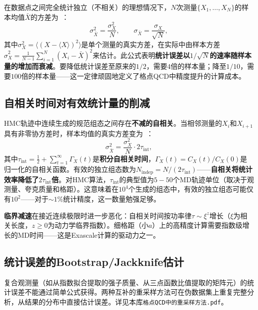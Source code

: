 \documentclass[12pt,a4paper]{ctexart}
\begin{document}
在数据点之间完全统计独立（不相关）的理想情况下，$N$次测量$\{X_1,\dots,X_N\}$的样本均值$\bar X$的方差为~\cite{GattringerLang2010}：
\begin{equation}
\boxed{\sigma^2_{\bar X} = \frac{\sigma_X^2}{N}, \qquad \sigma_{\bar X} = \frac{\sigma_X}{\sqrt{N}}},
\label{eq:sigma_over_rootN}
\end{equation}
其中$\sigma_X^2 = \langle (X - \langle X\rangle)^2 \rangle$是单个测量的真实方差，在实际中由样本方差$\hat\sigma_X^2 = \frac{1}{N-1}\sum_{i=1}^N (X_i - \bar X)^2$来估计。此公式表明\textbf{统计误差以$1/\sqrt{N}$的速率随样本量的增加而衰减}。要降低统计误差至原来的$1/2$，需要$4$倍的样本量；降至$1/10$，需要$100$倍的样本量——这一定律顽固地定义了格点QCD中精度提升的计算成本。

\subsection{自相关时间对有效统计量的削减}

HMC轨迹中连续生成的规范组态之间存在\textbf{不减的自相关}。当相邻测量的$X_i$和$X_{i+1}$具有非零协方差时，样本均值的真实方差变为~\cite{GattringerLang2010}：
\begin{equation}
\boxed{\sigma^2_{\bar X} = \frac{\sigma_X^2}{N} \cdot 2\tau_{\text{int}}},
\label{eq:correlated_sigma}
\end{equation}
其中$\tau_{\text{int}} = \frac{1}{2} + \sum_{t=1}^\infty \Gamma_X(t)$是\textbf{积分自相关时间}，$\Gamma_X(t) = C_X(t)/C_X(0)$是归一化的自相关函数。有效的独立组态数为$N_{\text{indep}} = N/(2\tau_{\text{int}})$——\textbf{自相关将统计效率降低了$2\tau_{\text{int}}$倍}。对HMC算法，$\tau_{\text{int}}$的典型值为$5-50$个MD轨迹单位（取决于观测量、夸克质量和格距）。这意味着在$10^4$个生成的组态中，有效的独立组态可能仅有$10^2$——对于$\sim 1\%$统计精度，这一数量勉强足够。

\textbf{临界减速}在接近连续极限时进一步恶化：自相关时间按功率律$\tau \sim \xi^z$增长（$\xi$为相关长度，$z\ge 0$为动力学临界指数）。细格距（小$a$）上的高精度计算需要指数级增长的MD时间——这是Exascale计算的驱动力之一。

\subsection{统计误差的Bootstrap/Jackknife估计}

复合观测量（如从指数拟合提取的强子质量、从三点函数比值提取的矩阵元）的统计误差不能通过简单公式获得。两种互补的重采样方法可在伪数据集上重复完整分析，从结果的分布中直接估计误差。详见本库\texttt{格点QCD中的重采样方法.pdf}。
\end{document}
